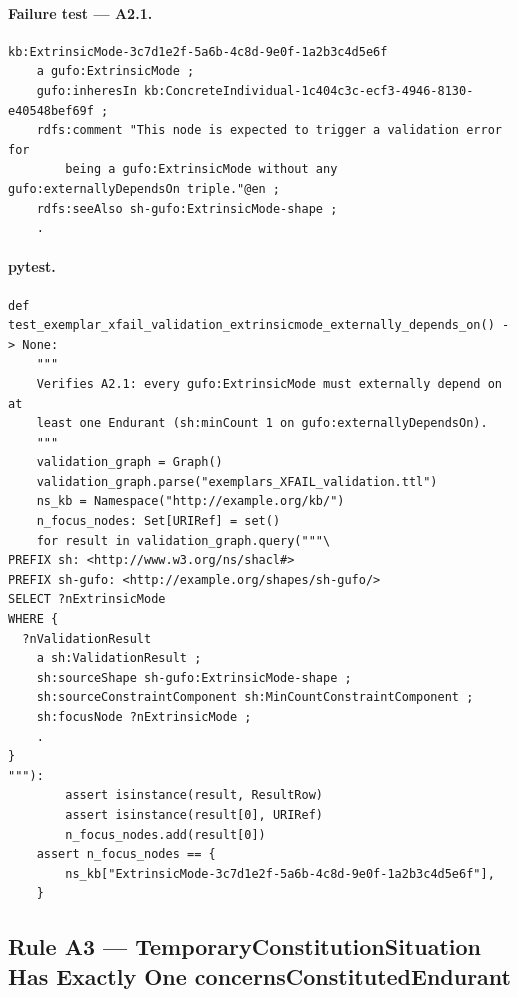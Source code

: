 \documentclass[12pt,a4paper]{article}
\begin{document}
\paragraph{Failure test --- A2.1.}

\begin{lstlisting}[style=turtlestyle]
kb:ExtrinsicMode-3c7d1e2f-5a6b-4c8d-9e0f-1a2b3c4d5e6f
    a gufo:ExtrinsicMode ;
    gufo:inheresIn kb:ConcreteIndividual-1c404c3c-ecf3-4946-8130-e40548bef69f ;
    rdfs:comment "This node is expected to trigger a validation error for
        being a gufo:ExtrinsicMode without any gufo:externallyDependsOn triple."@en ;
    rdfs:seeAlso sh-gufo:ExtrinsicMode-shape ;
    .
\end{lstlisting}

\paragraph{pytest.}

\begin{lstlisting}[style=pythonstyle]
def test_exemplar_xfail_validation_extrinsicmode_externally_depends_on() -> None:
    """
    Verifies A2.1: every gufo:ExtrinsicMode must externally depend on at
    least one Endurant (sh:minCount 1 on gufo:externallyDependsOn).
    """
    validation_graph = Graph()
    validation_graph.parse("exemplars_XFAIL_validation.ttl")
    ns_kb = Namespace("http://example.org/kb/")
    n_focus_nodes: Set[URIRef] = set()
    for result in validation_graph.query("""\
PREFIX sh: <http://www.w3.org/ns/shacl#>
PREFIX sh-gufo: <http://example.org/shapes/sh-gufo/>
SELECT ?nExtrinsicMode
WHERE {
  ?nValidationResult
    a sh:ValidationResult ;
    sh:sourceShape sh-gufo:ExtrinsicMode-shape ;
    sh:sourceConstraintComponent sh:MinCountConstraintComponent ;
    sh:focusNode ?nExtrinsicMode ;
    .
}
"""):
        assert isinstance(result, ResultRow)
        assert isinstance(result[0], URIRef)
        n_focus_nodes.add(result[0])
    assert n_focus_nodes == {
        ns_kb["ExtrinsicMode-3c7d1e2f-5a6b-4c8d-9e0f-1a2b3c4d5e6f"],
    }
\end{lstlisting}

\subsection{Rule A3 --- TemporaryConstitutionSituation Has Exactly One concernsConstitutedEndurant}
\label{sec:rule-a3}
\end{document}
